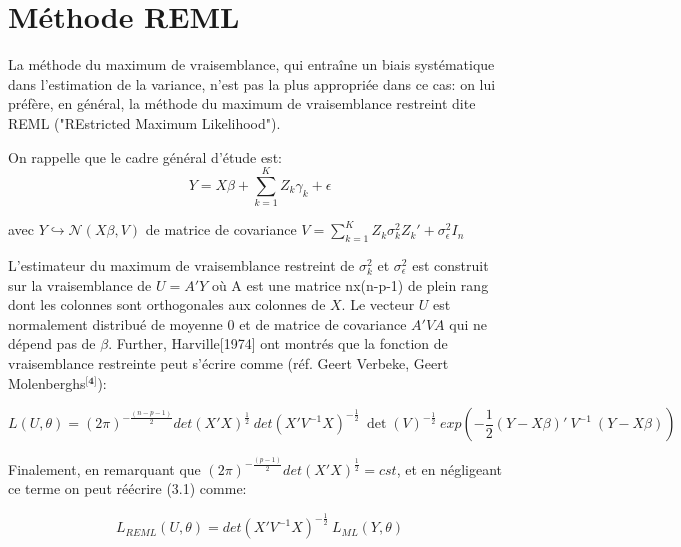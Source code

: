 \documentclass[11pt,fleqn]{book} %
\begin{document}

\chapter{Méthode REML}


\vspace{1em}

La méthode du maximum de vraisemblance, qui entraîne un biais systématique dans l’estimation de la variance, n’est pas la plus appropriée dans ce cas: on lui préfère, en général, la méthode du maximum de vraisemblance restreint dite REML ("REstricted Maximum Likelihood").

\vspace{2em}

On rappelle que le cadre général d'étude est: 
\begin{equation*} 
Y=X\beta+\sum_{k=1}^{K} Z_k \gamma_k+\epsilon 
\end{equation*}

avec \: $ Y\hookrightarrow\mathcal{N}(X\beta,V)$ \:de matrice de covariance $V=\sum_{k=1}^{K} Z_k \sigma_k^2 Z_k'+\sigma_{\epsilon}^2 I_{n}$

\vspace{2em}

L'estimateur du maximum de vraisemblance restreint de $\sigma_k^2$ et $\sigma_{\epsilon}^2$ est construit sur la vraisemblance de $U=A'Y$ où A est une matrice n\:x\:(n-p-1) de plein rang dont les colonnes sont orthogonales aux colonnes de $X$. Le vecteur $U$ est normalement distribué de moyenne 0 et de matrice de covariance $A'V A$ qui ne dépend pas de $\beta$. Further, Harville[1974] ont montrés que la fonction de vraisemblance restreinte peut s'écrire comme (réf. Geert Verbeke, Geert Molenberghs$^{\textbf{[4]}}$):

\begin{equation}
L(U,\theta)=(2\pi)^{-\frac{(n-p-1)}{2}} det(X'X)^{\frac{1}{2}}\:det(X'V^{-1}X)^{-\frac{1}{2}}\:\det(V)^{-\frac{1}{2}}\:exp\left(-\frac{1}{2}(Y-X\beta)'\:V^{-1}\:(Y-X\beta)\right) 
\end{equation}

Finalement, en remarquant que $(2\pi)^{-\frac{(p-1)}{2}} det(X'X)^{\frac{1}{2}}=cst$, et en négligeant ce terme on peut réécrire (3.1) comme:

\begin{equation}
L_{REML}(U,\theta)= det(X'V^{-1}X)^{-\frac{1}{2}}\: L_{ML}(Y,\theta)
\end{equation}
\end{document}
